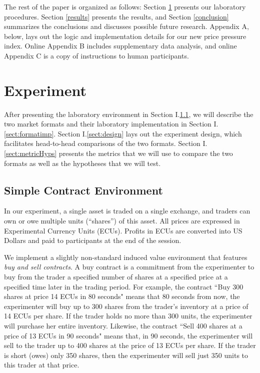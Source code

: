 \documentclass[12pt]{article}
\begin{document}
The rest of the paper is organized as follows: Section \ref{Experiment} presents our laboratory procedures. Section \ref{results} presents the results, and Section \ref{conclusion} summarizes the conclusions and discusses possible future research. 
Appendix A, below, lays out the logic and implementation details for our new price pressure index.
Online Appendix B includes supplementary data analysis, and online Appendix C is a copy of instructions to human participants.




\section{Experiment}
\label{Experiment}

After presenting the laboratory environment in Section I.\ref{sect:contracts}, we will describe the two market formats and their laboratory implementation in Section I.\ref{sect:formatimp}.
Section I.\ref{sect:design} lays out the experiment design, which facilitates head-to-head comparisons of the two formats. 
Section I.\ref{sect:metricHyps} presents the metrics that we will use to compare the two formats as well as the hypotheses that we will test.
\subsection{Simple Contract Environment}\label{sect:contracts}

In our experiment, a single asset is traded on a single exchange, and traders can own or owe multiple units (``shares'') of this asset. All prices are expressed in Experimental Currency Units (ECUs).
Profits in ECUs are converted into US Dollars and paid to participants at the end of the session.

We implement a slightly non-standard induced value environment that features  \textit{buy and sell contracts}. 
A buy contract is a commitment from the experimenter to buy from the trader a specified number of shares at a specified price at a specified time later in the trading period. 
For example, the contract ``Buy 300 shares at price  14 ECUs in 80 seconds" means that 80 seconds from now, the experimenter will buy up to 300 shares from the trader's inventory at a price of 14 ECUs per share. If the trader holds no more than 300 units, the experimenter will purchase her entire inventory. 
Likewise, the contract ``Sell 400 shares at a price of 13 ECUs in 90 seconds" means that, in 90 seconds, the experimenter will sell to the trader up to 400 shares at the price of 13 ECUs per share. If the trader is short (owes) only 350 shares, then the experimenter will sell just 350 units to this trader at that price. 
\end{document}
